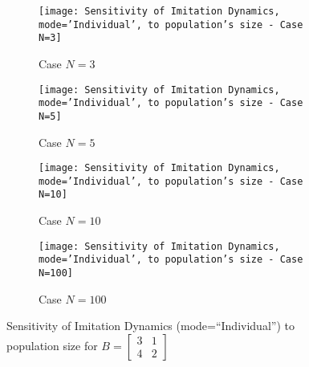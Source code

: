 	\begin{figure}[h]
		\centering
		\begin{subfigure}[t]{.49\textwidth}
			\centering
			\texttt{[image: Sensitivity of Imitation Dynamics, mode='Individual', to population's size - Case N=3]}
			\caption{Case $N=3$}
			\label{fig:example18}
		\end{subfigure}
		\begin{subfigure}[t]{.49\textwidth}
			\centering
			\texttt{[image: Sensitivity of Imitation Dynamics, mode='Individual', to population's size - Case N=5]}
			\caption{Case $N=5$}
			\label{fig:example19}
		\end{subfigure}
		\par\vspace{1em}
		\begin{subfigure}[t]{.49\textwidth}
			\centering
			\texttt{[image: Sensitivity of Imitation Dynamics, mode='Individual', to population's size - Case N=10]}
			\caption{Case $N=10$}
			\label{fig:example20}
		\end{subfigure}
		\begin{subfigure}[t]{.49\textwidth}
			\centering
			\texttt{[image: Sensitivity of Imitation Dynamics, mode='Individual', to population's size - Case N=100]}
			\caption{Case $N=100$}
			\label{fig:example21}
		\end{subfigure}
		\caption{Sensitivity of Imitation Dynamics (mode=``Individual'') to population size for $B = \begin{bmatrix} 3 & 1 \\ 4 & 2 \end{bmatrix}$}
		\label{fig:Sensitivity of Imitation Dynamics, mode='Individual', to population's size}
	\end{figure}
	
